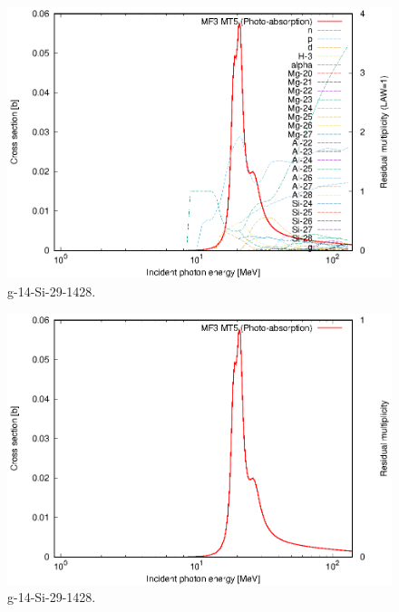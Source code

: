 \begin{figure}
 \includegraphics[width=\linewidth]{eps/g_14-Si-29_1428.eps}
  \caption{g-14-Si-29-1428.}
\end{figure}
\begin{figure}
 \includegraphics[width=\linewidth]{eps-law0/g_14-Si-29_1428.eps}
 \caption{g-14-Si-29-1428.}
\end{figure}
\newpage \clearpage

